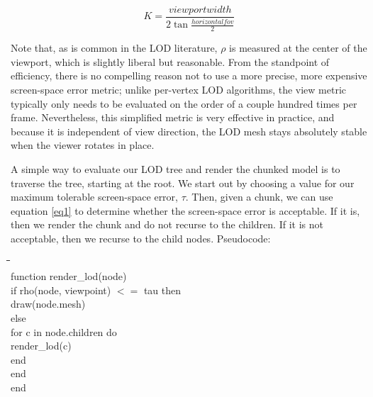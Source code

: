 \documentclass[12pt]{article}
\begin{document}
\begin{equation}
K = \frac{ viewportwidth }{ 2 \tan \frac{horizontalfov}{2} }
\label{eq3}
\end{equation}
 
Note that, as is common in the LOD literature, $\rho$ is measured at
the center of the viewport, which is slightly liberal but reasonable.
From the standpoint of efficiency, there is no compelling reason not
to use a more precise, more expensive screen-space error metric;
unlike per-vertex LOD algorithms, the view metric typically only needs
to be evaluated on the order of a couple hundred times per frame.
Nevertheless, this simplified metric is very effective in practice,
and because it is independent of view direction, the LOD mesh stays
absolutely stable when the viewer rotates in place.
 
A simple way to evaluate our LOD tree and render the chunked model is
to traverse the tree, starting at the root.  We start out by choosing
a value for our maximum tolerable screen-space error, $\tau$.
Then, given a chunk, we can use equation \ref{eq1} to determine whether the
screen-space error is acceptable.  If it is, then we render the chunk
and do not recurse to the children.  If it is not acceptable, then we
recurse to the child nodes.  Pseudocode:


\begin{ttfamily}
\begin{tabbing}
\hspace{0.25in}\=\hspace{0.25in}\=\hspace{0.25in}\=\hspace{0.25in}\=\hspace{0.25in}\= \\
function render\_lod(node) 							\\
\>	if rho(node, viewpoint) $<=$ tau then			\\
\>\>		draw(node.mesh)							\\
\>	else									\\
\>\>		for c in node.children do					\\
\>\>\>			render\_lod(c)						\\
\>\>		end								\\
\>	end									\\
end										\\
\end{tabbing}
\end{ttfamily}
\end{document}
